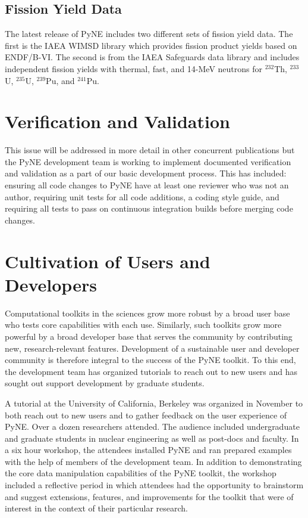 \documentclass{anstrans}
\begin{document}
\subsection{Fission Yield Data}

The latest release of PyNE includes two different sets of fission yield data. 
The first is the IAEA WIMSD library which provides fission product yields 
based on ENDF/B-VI. The second is from the IAEA Safeguards data library and includes 
independent fission yields with thermal, fast, and 14-MeV neutrons for $^{232}$Th, 
$^{233}$U, $^{235}$U, $^{239}$Pu, and $^{241}$Pu.

\section{Verification and Validation}

This issue will be addressed in more detail in other concurrent publications 
but the PyNE development team is working to implement documented verification 
and validation as a part of our basic development process. This has included: 
ensuring all code changes to PyNE have at least one reviewer who was not an 
author, requiring unit tests for all code additions, a coding style guide, 
and requiring all tests to pass on continuous integration builds before 
merging code changes. 


\section{Cultivation of Users and Developers} 
Computational toolkits in the sciences grow more robust by a broad user base 
who tests core capabilities with each use. Similarly, such toolkits grow more 
powerful by a broad developer base that serves the community by contributing 
new, research-relevant features. Development of a sustainable user and 
developer community is therefore integral to the success of the PyNE toolkit. 
To this end, the development team has organized tutorials to reach out to new 
users and has sought out support development by graduate students.

A tutorial at the University of California, Berkeley was organized in November 
to both reach out to new users and to gather feedback on the user experience of 
PyNE. Over a dozen researchers attended. The audience included undergraduate 
and graduate students in nuclear engineering as well as post-docs and faculty. 
In a six hour workshop, the attendees installed PyNE and ran prepared examples 
with the help of members of the development team. In addition to demonstrating 
the core data manipulation capabilities of the PyNE toolkit, the workshop 
included a reflective period in which attendees had the opportunity to 
brainstorm and suggest extensions, features, and improvements for the toolkit 
that were of interest in the context of their particular research.
\end{document}
